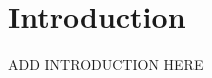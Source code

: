 \documentclass[../main.tex]{subfiles}
\begin{document}
\section{Introduction}
\label{sec:introduction}
ADD INTRODUCTION HERE \cite{ERC721} \cite{ERC1155}
\end{document}
